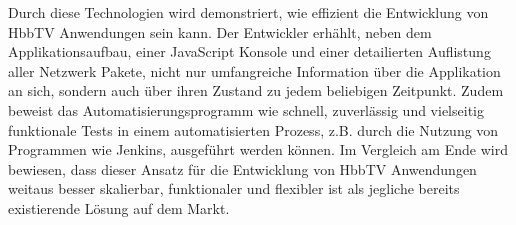 Durch diese Technologien wird demonstriert, wie effizient die Entwicklung von HbbTV Anwendungen sein kann. Der Entwickler erhählt, neben dem Applikationsaufbau, einer JavaScript Konsole und einer detailierten Auflistung aller Netzwerk Pakete, nicht nur umfangreiche Information über die Applikation an sich, sondern auch über ihren Zustand zu jedem beliebigen Zeitpunkt. Zudem beweist das Automatisierungsprogramm wie schnell, zuverlässig und vielseitig funktionale Tests in einem automatisierten Prozess, z.B. durch die Nutzung von Programmen wie Jenkins, ausgeführt werden können. Im Vergleich am Ende wird bewiesen, dass dieser Ansatz für die Entwicklung von HbbTV Anwendungen weitaus besser skalierbar, funktionaler und flexibler ist als jegliche bereits existierende Lösung auf dem Markt.
